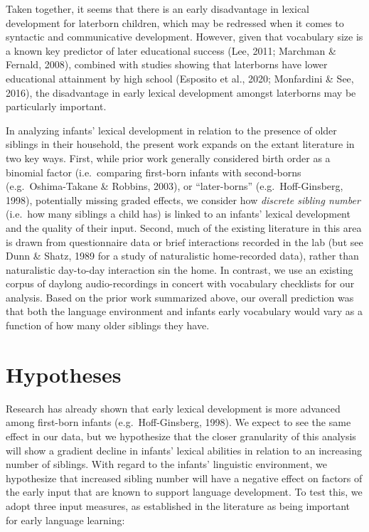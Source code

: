 \documentclass[
  english,
  man,floatsintext]{apa6}
\begin{document}
Taken together, it seems that there is an early disadvantage in lexical development for laterborn children, which may be redressed when it comes to syntactic and communicative development. However, given that vocabulary size is a known key predictor of later educational success (Lee, 2011; Marchman \& Fernald, 2008), combined with studies showing that laterborns have lower educational attainment by high school (Esposito et al., 2020; Monfardini \& See, 2016), the disadvantage in early lexical development amongst laterborns may be particularly important.

In analyzing infants' lexical development in relation to the presence of older siblings in their household, the present work expands on the extant literature in two key ways. First, while prior work generally considered birth order as a binomial factor (i.e.~comparing first-born infants with second-borns (e.g.~Oshima-Takane \& Robbins, 2003), or \enquote{later-borns} (e.g.~Hoff-Ginsberg, 1998), potentially missing graded effects, we consider how \emph{discrete sibling number} (i.e.~how many siblings a child has) is linked to an infants' lexical development and the quality of their input. Second, much of the existing literature in this area is drawn from questionnaire data or brief interactions recorded in the lab (but see Dunn \& Shatz, 1989 for a study of naturalistic home-recorded data), rather than naturalistic day-to-day interaction sin the home. In contrast, we use an existing corpus of daylong audio-recordings in concert with vocabulary checklists for our analysis. Based on the prior work summarized above, our overall prediction was that both the language environment and infants early vocabulary would vary as a function of how many older siblings they have.

\hypertarget{hypotheses}{%
\section{Hypotheses}\label{hypotheses}}

Research has already shown that early lexical development is more advanced among first-born infants (e.g.~Hoff-Ginsberg, 1998). We expect to see the same effect in our data, but we hypothesize that the closer granularity of this analysis will show a gradient decline in infants' lexical abilities in relation to an increasing number of siblings.
With regard to the infants' linguistic environment, we hypothesize that increased sibling number will have a negative effect on factors of the early input that are known to support language development. To test this, we adopt three input measures, as established in the literature as being important for early language learning:
\end{document}
